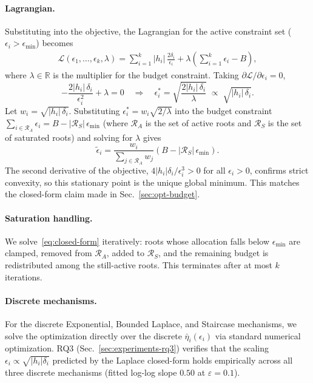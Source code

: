 \paragraph{Lagrangian.} Substituting into the objective, the Lagrangian for the active constraint set ($\epsilon_i > \epsilon_{\min}$) becomes
\begin{align*}
    \mathcal{L}(\epsilon_1, \dots, \epsilon_k, \lambda) = \sum_{i=1}^{k} |h_i|\,\frac{2\delta_i}{\epsilon_i} + \lambda\left(\sum_{i=1}^{k} \epsilon_i - B\right),
\end{align*}
where $\lambda \in \mathbb{R}$ is the multiplier for the budget constraint. Taking $\partial \mathcal{L}/\partial \epsilon_i = 0$,
\[
    -\frac{2|h_i|\,\delta_i}{\epsilon_i^2} + \lambda = 0
    \quad \Longrightarrow \quad
    \epsilon_i^* = \sqrt{\frac{2|h_i|\,\delta_i}{\lambda}}
    \;\propto\; \sqrt{|h_i|\,\delta_i}.
\]
Let $w_i = \sqrt{|h_i|\,\delta_i}$. Substituting $\epsilon_i^* = w_i \sqrt{2/\lambda}$ into the budget constraint $\sum_{i \in \mathcal{R}_A} \epsilon_i = B - |\mathcal{R}_S|\,\epsilon_{\min}$ (where $\mathcal{R}_A$ is the set of active roots and $\mathcal{R}_S$ is the set of saturated roots) and solving for $\lambda$ gives
\begin{equation}
\label{eq:closed-form}
    \tilde{\epsilon}_i = \frac{w_i}{\sum_{j \in \mathcal{R}_A} w_j} \left(B - |\mathcal{R}_S|\,\epsilon_{\min}\right).
\end{equation}
The second derivative of the objective, $4|h_i|\delta_i / \epsilon_i^3 > 0$ for all $\epsilon_i > 0$, confirms strict convexity, so this stationary point is the unique global minimum. This matches the closed-form claim made in Sec.~\ref{sec:opt-budget}.
 
\paragraph{Saturation handling.} We solve~\eqref{eq:closed-form} iteratively: roots whose allocation falls below $\epsilon_{\min}$ are clamped, removed from $\mathcal{R}_A$, added to $\mathcal{R}_S$, and the remaining budget is redistributed among the still-active roots. This terminates after at most $k$ iterations.
 
\paragraph{Discrete mechanisms.} For the discrete Exponential, Bounded Laplace, and Staircase mechanisms, we solve the optimization directly over the discrete $\bar{\eta}_i(\epsilon_i)$ via standard numerical optimization. RQ3 (Sec.~\ref{sec:experiments-rq3}) verifies that the scaling $\epsilon_i \propto \sqrt{|h_i| \delta_i}$ predicted by the Laplace closed-form holds empirically across all three discrete mechanisms (fitted log-log slope $0.50$ at $\varepsilon = 0.1$).
 
